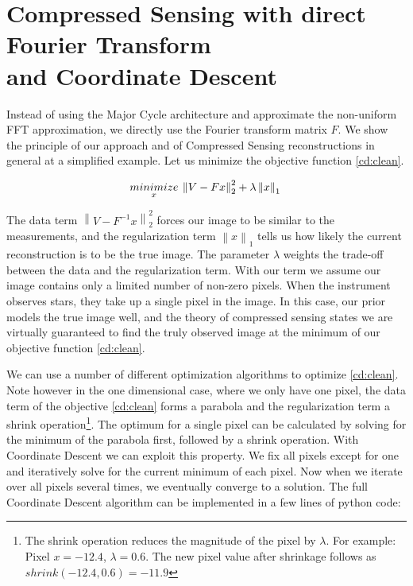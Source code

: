 \section{Compressed Sensing with direct Fourier Transform\\ and Coordinate Descent}\label{cd}
Instead of using the Major Cycle architecture and approximate the non-uniform FFT approximation, we directly use the Fourier transform matrix $F$. We show the principle of our approach and of Compressed Sensing reconstructions in general at a simplified example. Let us minimize the objective function \eqref{cd:clean}.

\begin{equation}\label{cd:clean}
\underset{x}{minimize} \: \left \| V - Fx \right \|_2^2 + \lambda \left \| x \right \|_1 \\
\end{equation}

The data term $\left \| V - F^{-1}x \right \|_2^2$ forces our image to be similar to the measurements, and the regularization term $\left \| x \right \|_1$ tells us how likely the current reconstruction is to be the true image. The parameter $\lambda$ weights the trade-off between the data and the regularization term. With our term we assume our image contains only a limited number of non-zero pixels.  When the instrument observes stars, they take up a single pixel in the image. In this case, our prior models the true image well, and the theory of compressed sensing states we are virtually guaranteed to find the truly observed image at the minimum of our objective function \eqref{cd:clean}.

We can use a number of different optimization algorithms to optimize \eqref{cd:clean}. Note however in the one dimensional case, where we only have one pixel, the data term of the objective \eqref{cd:clean} forms a parabola and the regularization term a shrink operation\footnote{The shrink operation reduces the magnitude of the pixel by $\lambda$. For example: Pixel $x = -12.4$, $\lambda = 0.6$. The new pixel value after shrinkage follows as $shrink(-12.4, 0.6) = -11.9$}. The optimum for a single pixel can be calculated by solving for the minimum of the parabola first, followed by a shrink operation. With Coordinate Descent we can exploit this property. We fix all pixels except for one and iteratively solve for the current minimum of each pixel. Now when we iterate over all pixels several times, we eventually converge to a solution. The full Coordinate Descent algorithm can be implemented in a few lines of python code:

